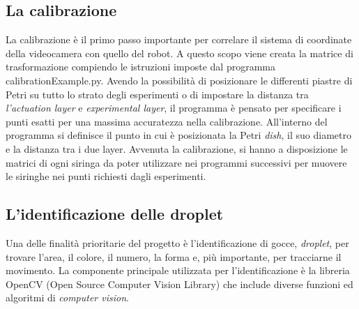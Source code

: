 \subsection{La calibrazione}
\label{sec:01123}
La calibrazione è il primo passo importante per correlare il sistema di coordinate della videocamera con quello del robot. A questo scopo viene creata la matrice di trasformazione compiendo le istruzioni imposte dal programma calibrationExample.py. 
Avendo la possibilità di posizionare le differenti piastre di Petri su tutto lo strato degli esperimenti o di impostare la distanza tra \emph{l'actuation layer} e \emph{experimental layer}, il programma è pensato per specificare i punti esatti per una massima accuratezza nella calibrazione. All'interno del programma si definisce il punto in cui è posizionata la Petri \emph{dish}, il suo diametro e la distanza tra i due layer.
Avvenuta la calibrazione, si hanno a disposizione le matrici di ogni siringa da poter utilizzare nei programmi successivi per muovere le siringhe nei punti richiesti dagli esperimenti.

\subsection{L'identificazione delle droplet}
\label{sec:02123}
Una delle finalità prioritarie del progetto è l'identificazione di gocce, \emph{droplet}, per trovare l'area, il colore, il numero, la forma e, più importante, per tracciarne il movimento. La componente principale utilizzata per l'identificazione è la libreria OpenCV (Open Source Computer Vision Library)\cite{opencv} che include diverse funzioni ed algoritmi di \emph{computer vision}. 











 

